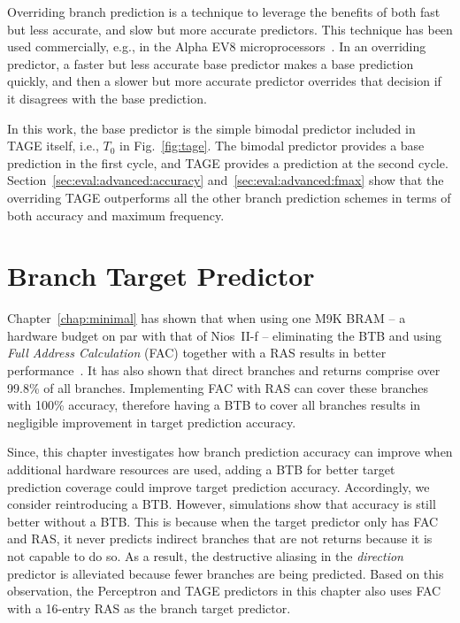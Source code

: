 Overriding branch prediction is a technique to leverage the benefits of both fast but less accurate, and slow but more accurate predictors. This technique has been used commercially, e.g., in the Alpha EV8 microprocessors~\cite{alphaEV8}. In an overriding predictor, a faster but less accurate base predictor makes a base prediction quickly, and then a slower but more accurate predictor overrides that decision if it disagrees with the base prediction. 

In this work, the base predictor is the simple bimodal predictor included in TAGE itself, i.e., $T_0$ in Fig.~\ref{fig:tage}. The bimodal predictor provides a base prediction in the first cycle, and TAGE provides a prediction at the second cycle. Section~\ref{sec:eval:advanced:accuracy} and~\ref{sec:eval:advanced:fmax} show that the overriding TAGE outperforms all the other branch prediction schemes in terms of both accuracy and maximum frequency.

\section{Branch Target Predictor}
\label{sec:advanced:target}
Chapter~\ref{chap:minimal} has shown that when using one M9K BRAM -- a hardware budget on par with that of Nios~II-f -- eliminating the BTB and using \textit{Full Address Calculation} (FAC) together with a RAS results in better performance~\cite{grselect}. It has also shown that direct branches and returns comprise over 99.8\% of all branches. Implementing FAC with RAS can cover these branches with 100\% accuracy, therefore having a BTB to cover all branches results in negligible improvement in target prediction accuracy.

Since, this chapter investigates how branch prediction accuracy can improve when additional hardware resources are used, adding a BTB for better target prediction coverage could improve target prediction accuracy. Accordingly, we consider reintroducing a BTB. However, simulations show that accuracy is still better without a BTB. This is because when the target predictor only has FAC and RAS, it never predicts indirect branches that are not returns because it is not capable to do so. As a result, the destructive aliasing in the \textit{direction} predictor is alleviated because fewer branches are being predicted. Based on this observation, the Perceptron and TAGE predictors in this chapter also uses FAC with a 16-entry RAS as the branch target predictor.



